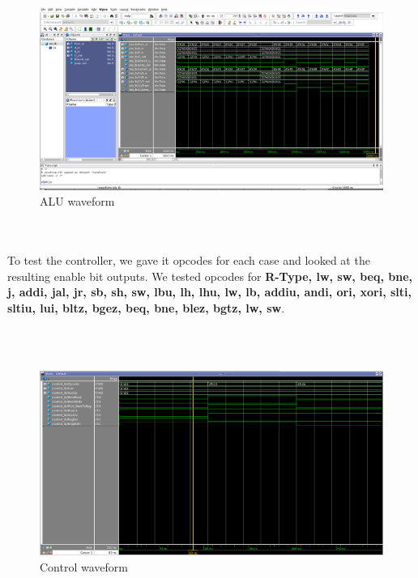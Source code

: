 \documentclass{article}
\begin{document}
\\ \\
\begin{figure}[!ht]
	\centering
		\includegraphics[width=1\textwidth]{ALU_waveform.png}
		\caption{ALU waveform}
\end{figure}
\\ \\

To test the controller, we gave it opcodes for each case and looked at the resulting enable bit outputs. We tested opcodes for \textbf{R-Type, lw, sw, beq, bne, j, addi, jal, jr, sb, sh, sw, lbu, lh, lhu, lw, lb, addiu, andi, ori, xori, slti, sltiu, lui, bltz, bgez, beq, bne, blez, bgtz, lw, sw}.

\\ \\
\begin{figure}[!ht]
	\centering
		\includegraphics[width=1\textwidth]{control_waveform.png}
		\caption{Control waveform}
\end{figure}
\\ \\
\end{document}
